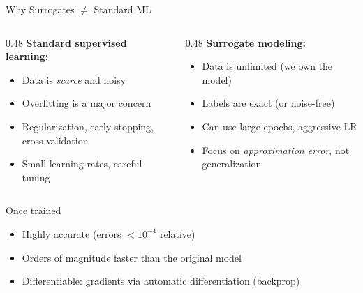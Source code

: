 \documentclass[aspectratio=169,11pt]{beamer}
\newcommand{\emphc}[1]{\textcolor{harvardcrimson}{#1}}
\begin{document}
\begin{frame}[shrink=4]{Why Surrogates $\neq$ Standard ML}
\begin{columns}[T]
\begin{column}{0.48\textwidth}
\textbf{Standard supervised learning:}
\begin{itemize}
  \item Data is \emph{scarce} and noisy
  \item Overfitting is a major concern
  \item Regularization, early stopping, cross-validation
  \item Small learning rates, careful tuning
\end{itemize}
\end{column}
\begin{column}{0.48\textwidth}
\textbf{Surrogate modeling:}
\begin{itemize}
  \item Data is \emphc{unlimited} (we own the model)
  \item Labels are \emphc{exact} (or noise-free)
  \item Can use large epochs, aggressive LR
  \item Focus on \emph{approximation error}, not generalization
\end{itemize}
\end{column}
\end{columns}

\vspace{0.5cm}
\begin{block}{Once trained}
\begin{itemize}
  \item \emphc{Highly accurate} (errors $< 10^{-4}$ relative)
  \item \emphc{Orders of magnitude faster} than the original model
  \item \emphc{Differentiable:} gradients via automatic differentiation (backprop)
\end{itemize}
\end{block}
\end{frame}
\end{document}

